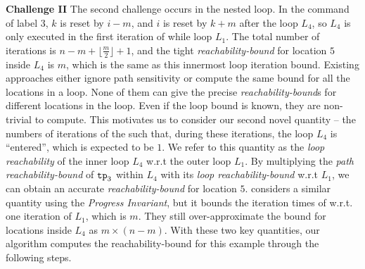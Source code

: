 \textbf{Challenge II} The second challenge occurs in the nested loop.
In the command of label 3, $k$ is reset by $i - m$, and $i$ is reset by $k + m$ after the
loop $L_4$, so $L_4$ is only executed in the first iteration of while loop $L_1$.
The total number of iterations is
$n - m + \lfloor\frac{m}{2}\rfloor + 1$,
and the tight \emph{reachability-bound} for location $5$ inside $L_4$ is $m$, which is the same as this innermost loop iteration bound.
Existing approaches either ignore path sensitivity or compute the same bound for all the locations in a loop.
None of them can give the precise \emph{reachability-bound}s for different locations in the loop.
Even if the loop bound is known, they are non-trivial to compute.
This motivates us to consider our second novel quantity --
the numbers of iterations of the  such that,
during these iterations, the loop $L_4$ is ``entered'', which is expected to be $1$. 
We refer to this quantity as the \emph{loop reachability} of the inner loop $L_4$ w.r.t the outer loop $L_1$.
By multiplying the \emph{path reachability-bound} of $\mathtt{tp}_3$ within $L_4$
with its \emph{loop reachability-bound} w.r.t $L_1$, we can obtain an accurate
\emph{reachability-bound} for location $5$.
\cite{GulwaniJK09} considers a similar quantity using the \emph{Progress Invariant}, but it bounds the iteration times of  w.r.t. one iteration of $L_1$, which is $m$. They still over-approximate the bound for locations inside $L_4$ as $m \times (n - m)$.
With these two key quantities, our algorithm computes the reachability-bound for this example through the following steps.
